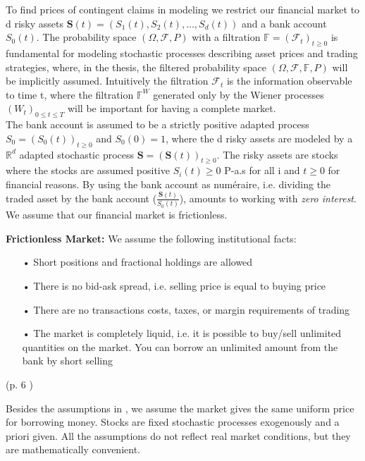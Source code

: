 To find prices of contingent claims in modeling we restrict our financial market to d risky assets $\bm{S}(t)=(S_1(t), S_2(t),\ldots, S_d(t))$ and a bank account $S_0(t)$. The probability space $(\Omega, \mathcal{F}, P)$ with a filtration $\mathbb{F}=(\mathcal{F}_t)_{t\geq 0}$ is fundamental for modeling stochastic processes describing asset prices and trading strategies, where, in the thesis, the filtered probability space $(\Omega, \mathcal{F}, \mathbb{F}, P)$ will be implicitly assumed. Intuitively the filtration $\mathcal{F}_t$ is the information observable to time t, where the filtration $\mathbb{F}^{W}$ generated only by the Wiener processes $(W_t)_{0\leq t \leq T}$ will be important for having a complete market.\\

The bank account is assumed to be a strictly positive adapted process $S_0=(S_0 (t))_{t \geq 0}$ and $S_0(0)=1$, where the d risky assets are modeled by a $\mathbb{R}^d$ adapted stochastic process $\bm{S}=(\bm{S}(t))_{t\geq 0}$. The risky assets are stocks where the stocks are assumed positive $S_i(t)\geq 0$ P-a.s for all i and $t\geq 0$ for financial reasons. By using the bank account as numéraire, i.e. dividing the traded asset by the bank account ($\frac{\bm{S}(t)}{S_0 (t)}$), amounts to working with \textit{zero interest}. We assume that our financial market is frictionless.
\theoremstyle{assumption}
\begin{assumption}{\textbf{Frictionless Market: }}\label{EfficientMarket}
We assume the following institutional facts:
\begin{enumerate}
\item[•] Short positions and fractional holdings are allowed
\item[•] There is no bid-ask spread, i.e. selling price is equal to buying price
\item[•] There are no transactions costs, taxes, or margin requirements of trading
\item[•] The market is completely liquid, i.e. it is possible to buy/sell unlimited quantities on the market. You can borrow an unlimited amount from the bank by short selling
\end{enumerate}
\hfill (p. 6 \parencite{finKont})
\end{assumption}
Besides the assumptions in \parencite{finKont}, we assume the market gives the same uniform price for borrowing money. Stocks are fixed stochastic processes exogenously and a priori given. All the assumptions do not reflect real market conditions, but they are mathematically convenient.

